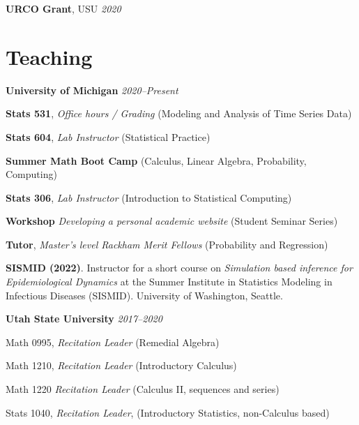 \documentclass[11pt]{article}
\newenvironment {teachinglsit}
                {
                 \begin{list}{}
                 {\setlength{\labelwidth}{0mm}
                  \setlength{\leftmargin}{5mm}
                  \setlength{\labelsep}{0mm}
                  \setlength{\parsep}{0.1 ex}
                  \setlength{\itemsep}{1pt}
      \setlength{\topsep}{0.15cm}}} %
   {\end{list}}
\begin{document}
\vspace{2mm}
\noindent\hspace{5mm}\textbf{URCO Grant}, USU \hfill  {\textit{2020}}

\hspace{5mm}{\it Award amount: $\$1000$}

\section*{Teaching}

\noindent \textbf{University of Michigan} \hfill  {\textit{2020--Present}}

\begin{teachinglsit}
    \item \textbf{Stats 531}, {\it Office hours / Grading} \hfill (Modeling and Analysis of Time Series Data)
    \item \textbf{Stats 604}, {\it Lab Instructor} \hfill (Statistical Practice)
    \item \textbf{Summer Math Boot Camp} \hfill (Calculus, Linear Algebra, Probability, Computing)
    \item \textbf{Stats 306}, {\it Lab Instructor} \hfill (Introduction to Statistical Computing)
    \item \textbf{Workshop} {\it Developing a personal academic website} \hfill (Student Seminar Series)
    \item \textbf{Tutor}, {\it Master's level Rackham Merit Fellows} \hfill (Probability and Regression)

\end{teachinglsit}

\vspace{2mm}
\noindent \textbf{SISMID (2022)}. Instructor for a short course on {\it Simulation based inference for Epidemiological Dynamics} at the Summer Institute in Statistics Modeling in Infectious Diseases (SISMID). University of Washington, Seattle.

\vspace{2mm}
\noindent \textbf{Utah State University} \hfill  {\textit{2017--2020}}

\begin{teachinglsit}
    \item Math 0995, {\it Recitation Leader} (Remedial Algebra)
    \item Math 1210, {\it Recitation Leader} (Introductory Calculus)
    \item Math 1220 {\it Recitation Leader} (Calculus II, sequences and series)
    \item Stats 1040, {\it Recitation Leader}, (Introductory Statistics, non-Calculus based)
\end{teachinglsit}
\end{document}
